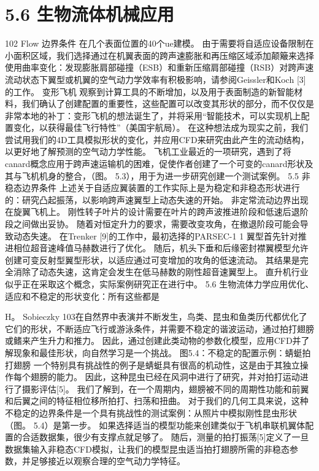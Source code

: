\documentclass[UTF8,11pt,a4paper,openany,fontset=fandol]{ctexbook}
\begin{document}
\section{5.6 生物流体机械应用}
102 Flow 边界条件 在几个表面位置的40个ue建模。 由于需要将自适应设备限制在小面积区域，我们选择通过在机翼表面的跨声速膨胀和再压缩区域添加颠簸来选择使用曲率变化：发现膨胀肩部碰撞（ESB）和重新压缩肩部碰撞（RSB）对跨声速流动状态下翼型或机翼的空气动力学效率有积极影响，请参阅Geissler和Koch [3]的工作。 变形飞机 观察到计算工具的不断增加，以及用于表面制造的新智能材料，我们确认了创建配置的重要性，这些配置可以改变其形状的部分，而不仅仅是非常本地的补丁：变形飞机的想法诞生了，并将采用“智能技术，可以实现机上配置变化，以获得最佳飞行特性”（美国宇航局）。 在这种想法成为现实之前，我们尝试用我们的4D工具模拟形状的变化，并应用CFD来研究由此产生的流动结构，以更好地了解预测的空气动力学性能。 飞机工业最近的一项研究，遇到了将canard概念应用于跨声速运输机的困难，促使作者创建了一个可变的canard形状及其与飞机机身的整合，（图。 5.3），用于为进一步研究创建一个测试案例。 5.5 非稳态边界条件 上述关于自适应翼装置的工作实际上是为稳定和非稳态形状进行的：研究凸起振荡，以影响跨声速翼型上动态失速的开始。 非定常流动边界出现在旋翼飞机上。 刚性转子叶片的设计需要在叶片的跨声波推进阶段和低速后退阶段之间做出妥协。 随着对恒定升力的要求，需要改变攻角，在撤退阶段可能会导致动态失速。 在Trenker [9]的工作中，最初选择的PARSEC-1 1 翼型首先针对推进相位超音速峰值马赫数进行了优化。 随后，机头下垂和后缘密封襟翼模型允许创建可变反射型翼型形状，以适应通过可变增加的攻角的低速流动。 其结果是完全消除了动态失速，这肯定会发生在低马赫数的刚性超音速翼型上。 直升机行业似乎正在采取这个概念，实际案例研究正在进行中。 5.6 生物流体力学应用优化、适应和不稳定的形状变化：所有这些都是

H。 Sobieczky 103在自然界中表演并不断发生，鸟类、昆虫和鱼类历代都优化了它们的形状，不断适应飞行或游泳条件，并需要不稳定的谐波运动，通过拍打翅膀或鳍来产生升力和推力。 因此，通过创建此类动物的参数化模型，应用CFD并了解现象和最佳形状，向自然学习是一个挑战。 图5.4：不稳定的配置示例：蜻蜓拍打翅膀 一个特别具有挑战性的例子是蜻蜓具有很高的机动性，这是由于其独立操作每个翅膀的能力。 因此，这种昆虫已经在风洞中进行了研究，并对拍打运动进行了摄影评估[5]。 我们了解到，在一个周期内，翅膀被不同的周期性功能和前翼和后翼之间的特征相位移所拍打、扫荡和扭曲。 对于我们的几何工具来说，这种不稳定的边界条件是一个具有挑战性的测试案例：从照片中模拟刚性昆虫形状（图。 5.4）是第一步。 如果选择适当的模型功能来创建类似于飞机串联机翼体配置的合适数据集，很少有支撑点就足够了。 随后，测量的拍打振荡[5]定义了一旦数据集输入非稳态CFD模拟，让我们的模型昆虫适当拍打翅膀所需的非稳态参数，并足够接近以观察合理的空气动力学特征。
\end{document}
